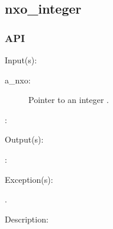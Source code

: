 %
%
%
%
%              

\subsection{nxo\_integer}
\label{nxo_integer}

\subsubsection{API}
\begin{capi}
\label{nxo_integer_}
	\begin{capilist}
	\item[Input(s): ]
		\begin{description}\item[]
		\item[a\_nxo: ]
			Pointer to an integer .
		\item[: ]
		\end{description}
	\item[Output(s): ]
		\begin{description}\item[]
		\item[: ]
		\end{description}
	\item[Exception(s): ]
		\begin{description}\item[]
		\item[.]
		\end{description}
	\item[Description: ]
	\end{capilist}
\end{capi}
